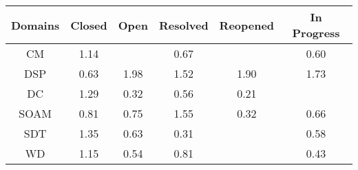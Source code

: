 \begin{tabular}{|c||c|c|c|c|c|}
\hline
Domains & Closed & Open & Resolved & Reopened & In Progress \\ 
\hline
CM & \cellcolor[rgb]{0.8566098313997585,0.8147099201367277,0.42} 1.14 &  & \cellcolor[rgb]{0.8477385544309866,0.5452958243066699,0.36188931746892083} 0.67 &  & \cellcolor[rgb]{0.833866530039723,0.4796349088546888,0.3489420947037415} 0.60 \\ 
\hline
DSP & \cellcolor[rgb]{0.8400139193175049,0.5087325514361896,0.35467965802967116} 0.63 & \cellcolor[rgb]{0.53,0.66,0.42} 1.98 & \cellcolor[rgb]{0.7088709082491514,0.7447283249601244,0.42} 1.52 & \cellcolor[rgb]{0.5627465427593712,0.675511520254439,0.42} 1.90 & \cellcolor[rgb]{0.6276295725663016,0.7062455870050902,0.42} 1.73 \\ 
\hline
DC & \cellcolor[rgb]{0.7994018662078504,0.7876114103089819,0.42} 1.29 & \cellcolor[rgb]{0.7801078056695578,0.225176946835907,0.2987672852915873} 0.32 & \cellcolor[rgb]{0.8268573400870771,0.4464580764121646,0.34240018408127193} 0.56 & \cellcolor[rgb]{0.76,0.13,0.28} 0.21 &  \\ 
\hline
SOAM & \cellcolor[rgb]{0.8732770078765637,0.6661778372824008,0.3857252073514593} 0.81 & \cellcolor[rgb]{0.8616458804549461,0.6111238341534108,0.3748694884246162} 0.75 & \cellcolor[rgb]{0.6962071737128661,0.7387297138639892,0.42} 1.55 & \cellcolor[rgb]{0.7816946059360758,0.23268780143075862,0.3002482988736707} 0.32 & \cellcolor[rgb]{0.8463273757044598,0.5386162450011095,0.36057221732416245} 0.66 \\ 
\hline
SDT & \cellcolor[rgb]{0.7755056957947611,0.7762921716922553,0.42000000000000004} 1.35 & \cellcolor[rgb]{0.8392807674639831,0.5052622993295193,0.3539953829663841} 0.63 & \cellcolor[rgb]{0.7794024688194181,0.22183835241191247,0.2981089708981236} 0.31 &  & \cellcolor[rgb]{0.8307454566749062,0.4648618282612225,0.3460290928965791} 0.58 \\ 
\hline
WD & \cellcolor[rgb]{0.852434041805772,0.8127319145395762,0.42} 1.15 & \cellcolor[rgb]{0.8234244438182272,0.4302090340729424,0.3391961475636788} 0.54 & \cellcolor[rgb]{0.8747641334419792,0.6732168982920348,0.3871131912125139} 0.81 &  & \cellcolor[rgb]{0.8011456356440836,0.3247560087153293,0.3184025932678114} 0.43 \\ 
\hline
\end{tabular}